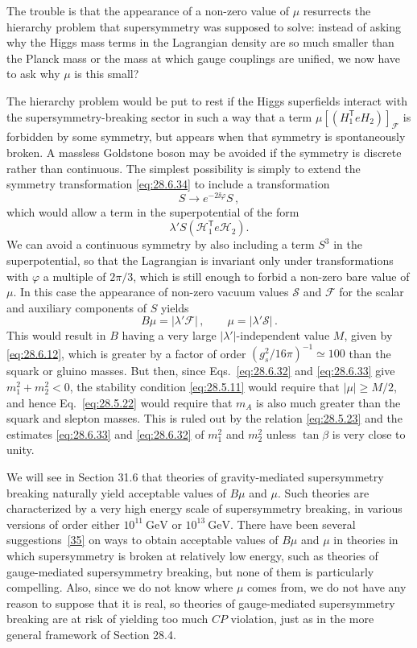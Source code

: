 The trouble is that the appearance of a non-zero value of \(\mu\)
resurrects the hierarchy problem that supersymmetry was supposed to solve:
instead of asking why the Higgs mass terms in the Lagrangian density are
so much smaller than the Planck mass or the mass at which gauge couplings
are unified, we now have to ask why \(\mu\) is this small?

The hierarchy problem would be put to rest if the Higgs superfields
interact with the supersymmetry-breaking sector in such a way that a term
\(\mu[(H_1^{\mathsf T}eH_2)]_{\mathcal{F}}\) is forbidden by some
symmetry, but appears when that symmetry is spontaneously broken. A
massless Goldstone boson may be avoided if the symmetry is discrete rather
than continuous. The simplest possibility is simply to extend the
symmetry transformation \eqref{eq:28.6.34} to include a transformation
\[
  S\longrightarrow e^{-2\ii\varphi}S\,,
\]
which would allow a term in the superpotential of the form
\[
  \lambda'S(\mathcal{H}_1^{\mathsf T}e\mathcal{H}_2).
\]
We can avoid a continuous symmetry by also including a term \(S^3\) in
the superpotential, so that the Lagrangian is invariant only under
transformations with \(\varphi\) a multiple of \(2\pi/3\), which is still
enough to forbid a non-zero bare value of \(\mu\). In this case the
appearance of non-zero vacuum values \(\mathcal{S}\) and \(\mathcal{F}\)
for the scalar and auxiliary components of \(S\) yields
\[
  B\mu=\lvert\lambda'\mathcal{F}\rvert\,,
  \qquad
  \mu=\lvert\lambda'\mathcal{S}\rvert\,.
\]
This would result in \(B\) having a very large
\(\lvert\lambda'\rvert\)-independent value \(M\), given by
\eqref{eq:28.6.12}, which is greater by a factor of order
\((g_s^2/16\pi)^{-1}\simeq100\) than the squark or gluino masses. But
then, since Eqs.~\eqref{eq:28.6.32} and \eqref{eq:28.6.33} give
\(m_1^2+m_2^2<0\), the stability condition \eqref{eq:28.5.11} would
require that \(\lvert\mu\rvert\geq M/2\), and hence
Eq.~\eqref{eq:28.5.22} would require that \(m_A\) is also much greater
than the squark and slepton masses. This is ruled out by the relation
\eqref{eq:28.5.23} and the estimates \eqref{eq:28.6.33} and
\eqref{eq:28.6.32} of \(m_1^2\) and \(m_2^2\) unless \(\tan\beta\) is
very close to unity.

We will see in Section 31.6 that theories of gravity-mediated
supersymmetry breaking naturally yield acceptable values of \(B\mu\) and
\(\mu\). Such theories are characterized by a very high energy scale of
supersymmetry breaking, in various versions of order either
\(10^{11}\ \mathrm{GeV}\) or \(10^{13}\ \mathrm{GeV}\). There have been
several suggestions~\hyperref[ch28-ref-35]{[35]} on ways to obtain
acceptable values of \(B\mu\) and \(\mu\) in theories in which
supersymmetry is broken at relatively low energy, such as theories of
gauge-mediated supersymmetry breaking, but none of them is particularly
compelling. Also, since we do not know where \(\mu\) comes from, we do not
have any reason to suppose that it is real, so theories of gauge-mediated
supersymmetry breaking are at risk of yielding too much \(CP\) violation,
just as in the more general framework of Section 28.4.

